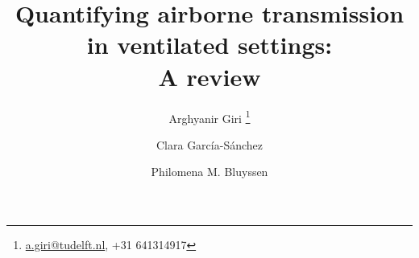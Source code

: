 \documentclass[a4paper,12pt]{elsarticle}
\begin{document}
\begin{frontmatter}



\title{Quantifying airborne transmission in ventilated settings:\\ A review}


\author[inst1]{Arghyanir Giri \footnote[2]{\href{mailto:a.giri@tudelft.nl}{a.giri@tudelft.nl}, +31 641314917}}


\author[inst1]{Clara García-Sánchez}
\author[inst1]{Philomena M. Bluyssen}



\end{frontmatter}
\end{document}
